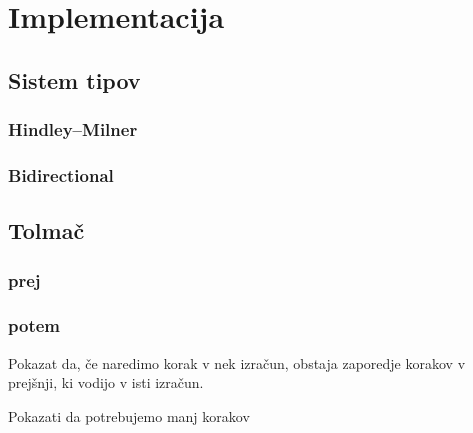 \section{Implementacija}\label{sec:impl}

\subsection{Sistem tipov}\label{sec:tipi}

\subsubsection{Hindley–Milner}

\subsubsection{Bidirectional}


\subsection{Tolmač}\label{sec:interpreter}

\subsubsection{prej}

\subsubsection{potem}

Pokazat da, če naredimo korak v nek izračun, obstaja zaporedje korakov v prejšnji, ki vodijo v isti izračun.

Pokazati da potrebujemo manj korakov